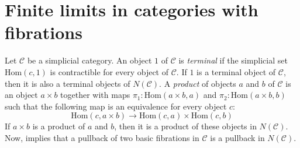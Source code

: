 \documentclass[reqno]{amsart}
\theoremstyle{definition}
\theoremstyle{remark}
\newcommand{\fs}[1]{\mathrm{#1}}
\newcommand{\Hom}{\fs{Hom}}
\newcommand{\cat}[1]{\mathcal{#1}}
\newcommand{\C}{\cat{C}}
\numberwithin{figure}{section}
\begin{document}
\section{Finite limits in categories with fibrations}

Let $\C$ be a simplicial category.
An object $1$ of $\C$ is \emph{terminal} if the simplicial set $\Hom(c,1)$ is contractible for every object of $\C$.
If $1$ is a terminal object of $\C$, then it is also a terminal objects of $N(\C)$.
A \emph{product} of objects $a$ and $b$ of $\C$ is an object $a \times b$ together with maps $\pi_1 : \Hom(a \times b, a)$ and $\pi_2 : \Hom(a \times b, b)$ such that the following map is an equivalence for every object $c$:
\[ \Hom(c, a \times b) \to \Hom(c,a) \times \Hom(c,b) \]
If $a \times b$ is a product of $a$ and $b$, then it is a product of these objects in $N(\C)$.
Now,  implies that a pullback of two basic fibrations in $\C$ is a pullback in $N(\C)$.



\end{document}
